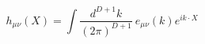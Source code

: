 \begin{equation}
 h_{\mu\nu}(X) = \int \frac{d^{D+1}k}{(2\pi)^{D+1}}~e_{\mu\nu}(k)e^{ik\cdot X}
\end{equation}

